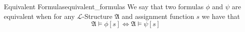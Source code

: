 \begin{definition}{Equivalent Formulas}{equivalent_formulas}
We say that two formulas $ \phi  $ and $ \psi  $ are equivalent when for any $\mathcal{L}$-Structure $ \mathfrak{ A }   $ and assignment function $ s $ we have that
\[
\mathfrak{ A } \models \phi  \left[ s  \right] \Leftrightarrow \mathfrak{ A } \models \psi \left[ s \right]  
\]
\end{definition}
